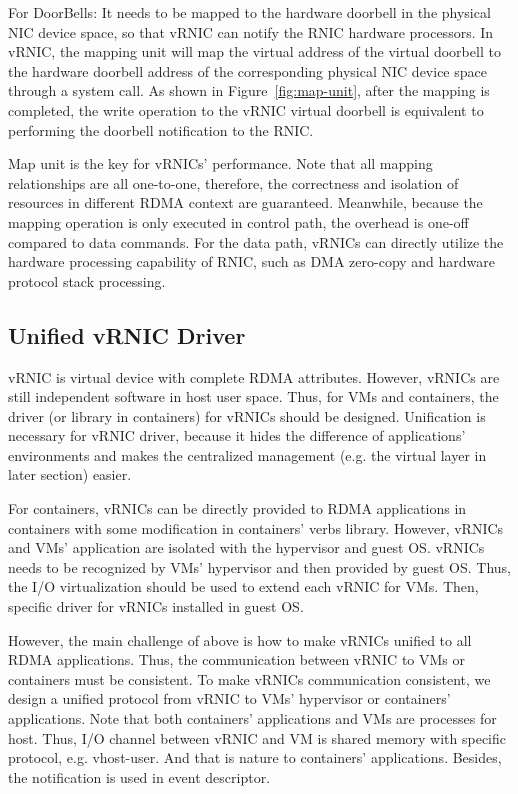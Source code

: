 For DoorBells: It needs to be mapped to the hardware doorbell in the physical NIC device space, so that vRNIC can notify the RNIC hardware processors. In vRNIC, the mapping unit will map the virtual address of the virtual doorbell to the hardware doorbell address of the corresponding physical NIC device space through a system call. As shown in Figure~\ref{fig:map-unit}, after the mapping is completed, the write operation to the vRNIC virtual doorbell is equivalent to performing the doorbell notification to the RNIC.

Map unit is the key for vRNICs' performance. Note that all mapping relationships are all one-to-one, therefore, the correctness and isolation of resources in different RDMA context are guaranteed. Meanwhile, because the mapping operation is only executed in control path, the overhead is one-off compared to data commands. For the data path, vRNICs can directly utilize the hardware processing capability of RNIC, such as DMA zero-copy and hardware protocol stack processing.

\subsection{Unified vRNIC Driver}
vRNIC is virtual device with complete RDMA attributes. However, vRNICs are still independent software in host user space. Thus, for VMs and containers, the driver (or library in containers) for vRNICs should be designed. Unification is necessary for vRNIC driver, because it hides the difference of applications' environments and makes the centralized management (e.g. the virtual layer in later section) easier.

For containers, vRNICs can be directly provided to RDMA applications in containers with some modification in containers' verbs library. However, vRNICs  and VMs' application are isolated with the hypervisor and guest OS. vRNICs needs to be recognized by VMs' hypervisor and then provided by guest OS. Thus, the I/O virtualization should be used to extend each vRNIC for VMs. Then, specific driver for vRNICs installed in guest OS. 

However, the main challenge of above is how to make vRNICs unified to all RDMA applications. Thus, the communication between vRNIC to VMs or containers must be consistent. To make vRNICs communication consistent, we design a unified protocol from vRNIC to VMs' hypervisor or containers' applications. Note that both containers' applications and VMs are processes for host. Thus, I/O channel between vRNIC and VM is shared memory with specific protocol, e.g. vhost-user. And that is nature to containers' applications. Besides, the notification is used in event descriptor.

